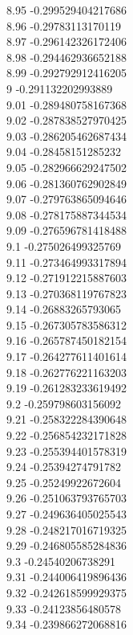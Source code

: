 {8.95	-0.299529404217686\\
8.96	-0.29783113170119\\
8.97	-0.296142326172406\\
8.98	-0.294462936652188\\
8.99	-0.292792912416205\\
9	-0.291132202993889\\
9.01	-0.289480758167368\\
9.02	-0.287838527970425\\
9.03	-0.286205462687434\\
9.04	-0.28458151285232\\
9.05	-0.282966629247502\\
9.06	-0.281360762902849\\
9.07	-0.279763865094646\\
9.08	-0.278175887344534\\
9.09	-0.276596781418488\\
9.1	-0.275026499325769\\
9.11	-0.273464993317894\\
9.12	-0.271912215887603\\
9.13	-0.270368119767823\\
9.14	-0.26883265793065\\
9.15	-0.267305783586312\\
9.16	-0.265787450182154\\
9.17	-0.264277611401614\\
9.18	-0.262776221163203\\
9.19	-0.261283233619492\\
9.2	-0.259798603156092\\
9.21	-0.258322284390648\\
9.22	-0.256854232171828\\
9.23	-0.255394401578319\\
9.24	-0.25394274791782\\
9.25	-0.25249922672604\\
9.26	-0.251063793765703\\
9.27	-0.249636405025543\\
9.28	-0.248217016719325\\
9.29	-0.246805585284836\\
9.3	-0.24540206738291\\
9.31	-0.244006419896436\\
9.32	-0.242618599929375\\
9.33	-0.24123856480578\\
9.34	-0.239866272068816\\
}
